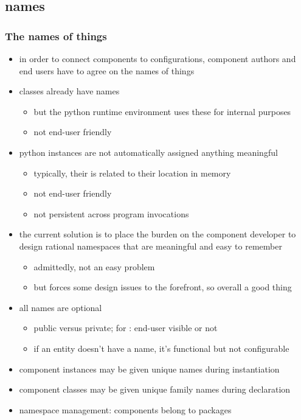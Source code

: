 \subsection{names}
\begin{frame}[fragile]
%
  \frametitle{The names of things}
%
  \begin{itemize}
%
  \item in order to connect components to configurations, component authors and end
    users have to agree on the names of things
%
  \item classes already have names
    \begin{itemize}
    \item but the python runtime environment uses these for internal purposes
    \item not end-user friendly
    \end{itemize}
%
  \item python instances are not automatically assigned anything meaningful
    \begin{itemize}
    \item typically, their  is related to their location in memory
    \item not end-user friendly
    \item not persistent across program invocations
    \end{itemize}
%
  \item the current solution is to place the burden on the component developer to design
    rational namespaces that are meaningful and easy to remember
    \begin{itemize}
    \item admittedly, not an easy problem
    \item but forces some design issues to the forefront, so overall a good thing\texttrademark
    \end{itemize}
%
  \item all names are optional
    \begin{itemize}
    \item public versus private; for \pyre: end-user visible or not
    \item if an entity doesn't have a name, it's functional but not configurable
    \end{itemize}
%
  \item component instances may be given unique names during instantiation
%
  \item component classes may be given unique family names during declaration
%
  \item namespace management: components belong to packages
%
  \end{itemize}
%
\end{frame}


